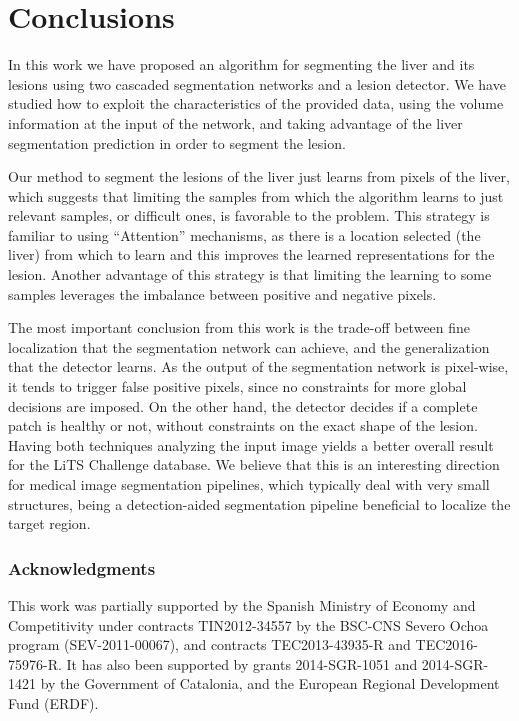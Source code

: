 \documentclass{article}
\begin{document}
\section{Conclusions}

In this work we have proposed an algorithm for segmenting the liver and its lesions using two cascaded segmentation networks and a lesion detector. We have studied how to exploit the characteristics of the provided data, using the volume information at the input of the network, and taking advantage of the liver segmentation prediction in order to segment the lesion. 

Our method to segment the lesions of the liver just learns from pixels of the liver, which suggests that limiting the samples from which the algorithm learns to just relevant samples, or difficult ones, is favorable to the problem. This strategy is familiar to using ``Attention'' mechanisms, as there is a location selected (the liver) from which to learn and this improves the learned representations for the lesion. Another advantage of this strategy is that limiting the learning to some samples leverages the imbalance between positive and negative pixels. 

The most important conclusion from this work is the trade-off between fine localization that the segmentation network can achieve, and the generalization that the detector learns. As the output of the segmentation network is pixel-wise, it tends to trigger false positive pixels, since no constraints for more global decisions are imposed. On the other hand, the detector decides if a complete patch is healthy or not, without constraints on the exact shape of the lesion. Having both techniques analyzing the input image yields a better overall result for the LiTS Challenge database. We believe that this is an interesting direction for medical image segmentation pipelines, which typically deal with very small structures, being a detection-aided segmentation pipeline beneficial to localize the target region.

\subsubsection*{Acknowledgments}

This work was partially supported by the Spanish Ministry of Economy and Competitivity under contracts TIN2012-34557 by the BSC-CNS Severo Ochoa program (SEV-2011-00067), and contracts TEC2013-43935-R and TEC2016-75976-R. It has also been supported by grants 2014-SGR-1051 and 2014-SGR-1421 by the Government of Catalonia, and the European Regional Development Fund (ERDF).

\small



\end{document}
